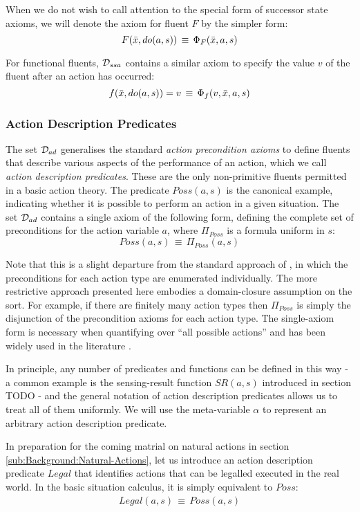 When we do not wish to call attention to the special form of successor
state axioms, we will denote the axiom for fluent $F$ by the simpler
form:\[
F(\bar{x},do(a,s))\,\equiv\,\Phi_{F}(\bar{x},a,s)\]


For functional fluents, $\mathcal{D}_{ssa}$ contains a similar axiom to specify
the value $v$ of the fluent after an action has occurred:\[
f(\bar{x},do(a,s))=v\,\equiv\,\Phi_{f}(v,\bar{x},a,s)\]



\subsubsection{Action Description Predicates}

The set $\mathcal{D}_{ad}$ generalises the standard \emph{action precondition
axioms} \citep{pirri99contributions_sitcalc} to define fluents that
describe various aspects of the performance of an action, which we
call \emph{action description predicates}. These are the only non-primitive
fluents permitted in a basic action theory. The predicate $Poss(a,s)$
is the canonical example, indicating whether it is possible to perform
an action in a given situation. The set $\mathcal{D}_{ad}$ contains a single
axiom of the following form, defining the complete set of preconditions
for the action variable $a$, where $\Pi_{Poss}$ is a formula uniform
in $s$:\[
Poss(a,s)\,\equiv\,\Pi_{Poss}(a,s)\]


Note that this is a slight departure from the standard approach of
\citep{pirri99contributions_sitcalc}, in which the preconditions
for each action type are enumerated individually. The more restrictive
approach presented here embodies a domain-closure assumption on the
 sort. For example, if there are finitely many action
types then $\Pi_{Poss}$ is simply the disjunction of the precondition
axioms for each action type. The single-axiom form is necessary when
quantifying over {}``all possible actions'' and has been widely
used in the literature \citep{vassos08progression_future_queries,savelli06sc_quantum_levels}.

In principle, any number of predicates and functions can be defined
in this way - a common example is the sensing-result function $SR(a,s)$
introduced in section TODO - and the general notation of action description
predicates allows us to treat all of them uniformly. We will use the
meta-variable $\alpha$ to represent an arbitrary action description
predicate.

In preparation for the coming matrial on natural actions in section
\ref{sub:Background:Natural-Actions}, let us introduce an action
description predicate $Legal$ that identifies actions that can be
legalled executed in the real world. In the basic situation calculus,
it is simply equivalent to $Poss$:\begin{gather*}
Legal(a,s)\,\equiv\, Poss(a,s)\end{gather*}



